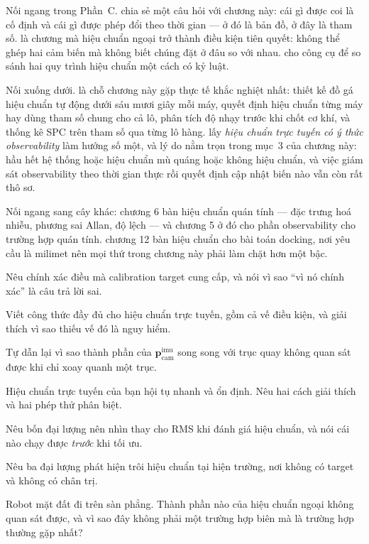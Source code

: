 \documentclass[../../vslam.tex]{subfiles}
\begin{document}
Nối ngang trong Phần~C.  chia sẻ một câu hỏi với chương này: cái gì được coi là cố định và cái gì được phép đổi theo thời gian --- ở đó là bản đồ, ở đây là tham số.  là chương mà hiệu chuẩn ngoại trở thành điều kiện tiên quyết: không thể ghép hai cảm biến mà không biết chúng đặt ở đâu so với nhau.  cho công cụ để so sánh hai quy trình hiệu chuẩn một cách có kỷ luật.

Nối xuống dưới.  là chỗ chương này gặp thực tế khắc nghiệt nhất: thiết kế đồ gá hiệu chuẩn tự động dưới sáu mươi giây mỗi máy, quyết định hiệu chuẩn từng máy hay dùng tham số chung cho cả lô, phân tích độ nhạy trước khi chốt cơ khí, và thống kê SPC trên tham số qua từng lô hàng.  lấy \emph{hiệu chuẩn trực tuyến có ý thức observability} làm hướng số một, và lý do nằm trọn trong mục~3 của chương này: hầu hết hệ thống hoặc hiệu chuẩn mù quáng hoặc không hiệu chuẩn, và việc giám sát observability theo thời gian thực rồi quyết định cập nhật biến nào vẫn còn rất thô sơ.

Nối ngang sang cây khác:  chương 6 bàn hiệu chuẩn quán tính --- đặc trưng hoá nhiễu, phương sai Allan, độ lệch --- và chương 5 ở đó cho phần observability cho trường hợp quán tính.  chương 12 bàn hiệu chuẩn cho bài toán docking, nơi yêu cầu là milimet nên mọi thứ trong chương này phải làm chặt hơn một bậc.

\begin{tukiem}
\item Nêu chính xác điều mà calibration target cung cấp, và nói vì sao ``vì nó chính xác'' là câu trả lời sai.
\item Viết công thức đầy đủ cho hiệu chuẩn trực tuyến, gồm cả vế điều kiện, và giải thích vì sao thiếu vế đó là nguy hiểm.
\item Tự dẫn lại vì sao thành phần của \(\mathbf{p}_{\text{cam}}^{\text{imu}}\) song song với trục quay không quan sát được khi chỉ xoay quanh một trục.
\item Hiệu chuẩn trực tuyến của bạn hội tụ nhanh và ổn định. Nêu hai cách giải thích và hai phép thử phân biệt.
\item Nêu bốn đại lượng nên nhìn thay cho RMS khi đánh giá hiệu chuẩn, và nói cái nào chạy được \emph{trước} khi tối ưu.
\item Nêu ba đại lượng phát hiện trôi hiệu chuẩn tại hiện trường, nơi không có target và không có chân trị.
\item Robot mặt đất đi trên sàn phẳng. Thành phần nào của hiệu chuẩn ngoại không quan sát được, và vì sao đây không phải một trường hợp biên mà là trường hợp thường gặp nhất?
\end{tukiem}
\ifSubfilesClassLoaded{\printbibliography[title={Nguồn}]}{}
\end{document}
